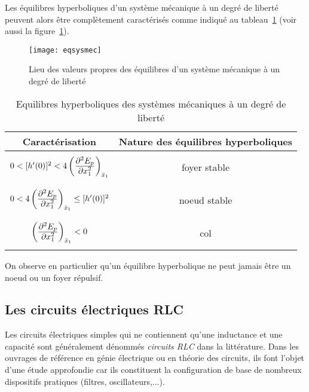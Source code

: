 Les {é}quilibres hyperboliques d'un syst{è}me m{é}canique {à} un degr{é} 
de libert{é} peuvent alors {ê}tre compl{è}tement caract{é}ris{é}s 
comme indiqu{é} au tableau~\ref{tab:tabsysmec} (voir aussi la figure~\ref{fig:eqsysmec}).
\begin{figure}[t] 
   \centering
   \texttt{[image: eqsysmec]} 
   \caption{Lieu des valeurs propres des équilibres d'un syst{è}me m{é}canique {à} un degr{é} de libert{é}}
   \label{fig:eqsysmec}
\end{figure}
\begin{table}
\hspace*{5mm}
\begin{tabular}{|c|c|}
\hline
Caract{é}risation&Nature des {é}quilibres hyperboliques\\ \hline
{}&{}\\
$0< [h'(0)]^2 <4 \left (\frac{{\textstyle \partial^2E_p}}{{\textstyle \partial x_1^2}}\right
)_{\bar x_1}$&foyer stable \\
{}&{}\\ \hline
{}&{}\\
$0<4 \left (\frac{{\textstyle \partial^2E_p}}{{\textstyle \partial x_1^2}}\right
)_{\bar x_1}\leq [h'(0)]^2$&noeud stable \\
{}&{}\\
 \hline
 {}&{}\\
$\left (\frac{{\textstyle \partial^2E_p}}{{\textstyle \partial x_1^2}}\right
)_{\bar x_1} <0$&col \\ 
{}&{}\\
\hline
\end{tabular}
\caption{Equilibres hyperboliques des syst{è}mes m{é}caniques à un degré
de liberté}
\label{tab:tabsysmec}
\end{table}
On observe en particulier qu'un {é}quilibre hyperbolique ne peut jamais {ê}tre un noeud ou un foyer répulsif.

\subsection{Les circuits électriques RLC}

Les circuits {é}lectriques simples qui ne contiennent qu'une inductance et 
une capacit{é} sont g{é}n{é}ralement d{é}nomm{é}s {\em circuits 
RLC} dans la litt{é}rature. Dans les ouvrages de r{é}f{é}rence en 
g{é}nie {é}lectrique ou en th{é}orie des circuits, ils font l'objet 
d'une {é}tude approfondie car ils constituent la configuration de base de
 nombreux dispositifs pratiques (filtres, oscillateurs,...).

